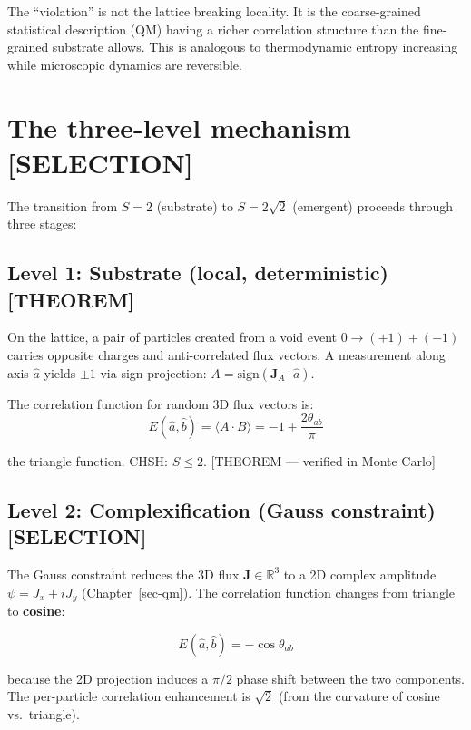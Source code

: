 \documentclass[
  11pt,
  letterpaper,
  twoside,
  openany]{book}
\makeatletter
\let\orig@section\section
\renewcommand{\section}{\needspace{8\baselineskip}\orig@section}
\let\orig@subsection\subsection
\renewcommand{\subsection}{\needspace{6\baselineskip}\orig@subsection}
\makeatother
\begin{document}
The ``violation'' is not the lattice breaking locality. It is the
coarse-grained statistical description (QM) having a richer correlation
structure than the fine-grained substrate allows. This is analogous to
thermodynamic entropy increasing while microscopic dynamics are
reversible.

\section{The three-level mechanism
{[}SELECTION{]}}\label{the-three-level-mechanism-selection}

The transition from \(S = 2\) (substrate) to \(S = 2\sqrt{2}\)
(emergent) proceeds through three stages:

\subsection{Level 1: Substrate (local, deterministic)
{[}THEOREM{]}}\label{level-1-substrate-local-deterministic-theorem}

On the lattice, a pair of particles created from a void event
\(0 \to (+1) + (-1)\) carries opposite charges and anti-correlated flux
vectors. A measurement along axis \(\hat{a}\) yields \(\pm 1\) via sign
projection: \(A = \text{sign}(\mathbf{J}_A \cdot \hat{a})\).

The correlation function for random 3D flux vectors is: \[
E(\hat{a}, \hat{b}) = \langle A \cdot B \rangle = -1 + \frac{2\theta_{ab}}{\pi}
\tag{17.1}
\]

the triangle function. CHSH: \(S \leq 2\). {[}THEOREM --- verified in
Monte Carlo{]}

\subsection{Level 2: Complexification (Gauss constraint)
{[}SELECTION{]}}\label{level-2-complexification-gauss-constraint-selection}

The Gauss constraint reduces the 3D flux \(\mathbf{J} \in \mathbb{R}^3\)
to a 2D complex amplitude \(\psi = J_x + iJ_y\) (Chapter~\ref{sec-qm}).
The correlation function changes from triangle to \textbf{cosine}:

\[
E(\hat{a}, \hat{b}) = -\cos\theta_{ab}
\tag{17.2}
\]

because the 2D projection induces a \(\pi/2\) phase shift between the
two components. The per-particle correlation enhancement is \(\sqrt{2}\)
(from the curvature of cosine vs.~triangle).
\end{document}
